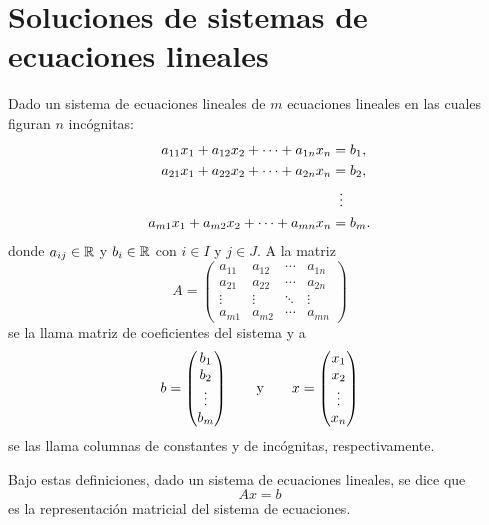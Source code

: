 \documentclass[a4,11pt]{aleph-notas}
\begin{document}
\section{Soluciones de sistemas de ecuaciones lineales}
\begin{defi}
    Dado un sistema de ecuaciones lineales de $m$ ecuaciones lineales en las cuales figuran $n$ incógnitas:
    \begin{align*}
        a_{11}x_1 + a_{12}x_2 + \cdots + a_{1n}x_n &= b_1,\\
        a_{21}x_1 + a_{22}x_2 + \cdots + a_{2n}x_n &= b_2,\\
            & \hspace{2mm} \vdots\\
        a_{m1}x_1 + a_{m2}x_2 + \cdots + a_{mn}x_n &= b_m.
    \end{align*}
    donde $a_{ij}\in\mathbb{R}$ y $b_i\in \mathbb{R}$ con $i\in I$ y $j\in J$. A la matriz
    \[
        A=\begin{pmatrix}
        a_{11} & a_{12} & \cdots & a_{1n}\\
        a_{21} & a_{22} & \cdots & a_{2n}\\
        \vdots & \vdots & \ddots & \vdots\\
        a_{m1} & a_{m2} & \cdots & a_{mn}
        \end{pmatrix}
    \]
    se la llama matriz de coeficientes del sistema y a 
    \[
        b=\begin{pmatrix}
        b_1 \\ b_2 \\ \vdots \\ b_m
        \end{pmatrix}
        \qquad\text{y}\qquad
        x=\begin{pmatrix}
        x_1 \\ x_2 \\ \vdots \\ x_n
        \end{pmatrix}
    \]
    se las llama columnas de constantes y de incógnitas, respectivamente.
\end{defi}

\begin{advertencia}
    Bajo estas definiciones, dado un sistema de ecuaciones lineales, se dice que
    \[
        Ax=b
    \]
    es la representación matricial del sistema de ecuaciones.
\end{advertencia}
\end{document}

